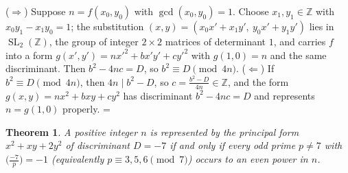 \documentclass[11pt]{article}
\makeatletter
\theoremstyle{ntstyle}
\newtheorem{theorem}{Theorem}[subsection]
\let\nt@closedisplay\]
\def\nt@guardedclose{\@ifnextchar\par{\nt@closeafterpar}{\@ifnextchar\end{\postdisplaypenalty\@M\nt@closedisplay}{\nt@closedisplay}}}
\def\nt@closeafterpar\par{\@ifnextchar\par{\nt@closeafterpar}{\@ifnextchar\end{\postdisplaypenalty\@M\nt@closedisplay\par}{\nt@closedisplay\par}}}
\renewenvironment{proof}[1][\proofname]{\par
  \pushQED{\qed}\normalfont\topsep\medskipamount\edef\nt@afterproof{\@endparpenalty=\the\@endparpenalty\relax}\@beginparpenalty\@M\@endparpenalty\@M\let\]\nt@guardedclose\trivlist\item[]\textit{#1\@addpunct{.}} \ignorespaces}{\ifvmode\addpenalty\@M\fi\popQED\nt@afterproof\endtrivlist\@endpefalse}
\newcommand{\legs}[2]{\bigl(\tfrac{#1}{#2}\bigr)}
\makeatother
\begin{document}
\begin{proof} ($\Rightarrow$) Suppose $n = f(x_0, y_0)$
	with $\gcd(x_0, y_0) = 1$. Choose $x_1, y_1 \in \mathbb{Z}$ with $x_0
		y_1 - x_1 y_0 = 1$; the substitution $(x, y) = (x_0 x' + x_1 y',\ y_0
		x' + y_1 y')$ lies in $\operatorname{SL}_2(\mathbb{Z})$, the group of integer $2\times2$ matrices
		of determinant $1$, and carries
	$f$ into a form $g(x', y') = n x'^{2} + b x'y' + c y'^{2}$ with $g(1,
		0) = n$ and the same discriminant. Then $b^{2} - 4nc = D$, so $b^{2}
		\equiv D \pmod{4n}$. ($\Leftarrow$) If $b^{2} \equiv D \pmod{4n}$,
	then $4n \mid b^{2} - D$, so $c = \tfrac{b^{2} - D}{4n} \in
		\mathbb{Z}$, and the form $g(x, y) = n x^{2} + b xy + c y^{2}$ has
	discriminant $b^{2} - 4nc = D$ and represents $n = g(1, 0)$ properly.\qedhere
\end{proof}

\begin{theorem}\label{thm:8.6.7} A positive integer $n$ is represented by the
	principal form $x^{2} + xy + 2y^{2}$ of discriminant $D = -7$ if and
	only if every odd prime $p\neq 7$ with $\legs{-7}{p} = -1$
	(equivalently $p \equiv 3, 5, 6 \pmod{7}$) occurs to an even power in $n$.
\end{theorem}
\end{document}
